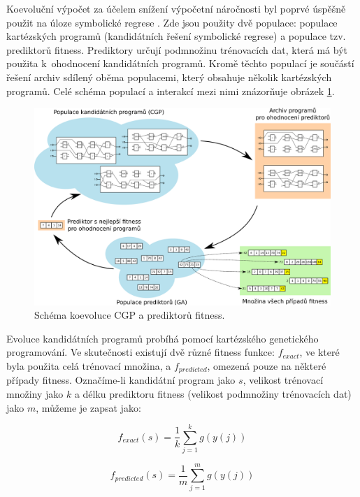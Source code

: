Koevoluční výpočet za účelem snížení výpočetní náročnosti byl poprvé úspěšně použit na úloze symbolické regrese \cite{SikuEuroGP}. Zde jsou použity dvě populace: populace kartézských programů (kandidátních řešení symbolické regrese) a populace tzv. prediktorů fitness. Prediktory určují podmnožinu trénovacích dat, která má být použita k~ohodnocení kandidátních programů. Kromě těchto populací je součástí řešení archiv sdílený oběma populacemi, který obsahuje několik kartézských programů. Celé schéma populací a interakcí mezi nimi znázorňuje obrázek \ref{obrKoevoluce}.

\begin{figure}[htb]
    \centering\includegraphics[width=\textwidth]{fig/coevolution.pdf}
    \caption{Schéma koevoluce CGP a prediktorů fitness.}
    \label{obrKoevoluce}
\end{figure}

Evoluce kandidátních programů probíhá pomocí kartézského genetického programování. Ve skutečnosti existují dvě různé fitness funkce: $f_{\mathit{exact}}$, ve které byla použita celá trénovací množina, a $f_{\mathit{predicted}}$, omezená pouze na některé případy fitness. Označíme-li kandidátní program jako $s$, velikost trénovací množiny jako $k$ a délku prediktoru fitness (velikost podmnožiny trénovacích dat) jako $m$, můžeme je zapsat jako:

\begin{equation}
    \label{eqFexact}
    f_{\mathit{exact}} \left( s \right) = \frac{1}{k} \sum\limits_{j=1}^{k} g \left( y \left( j \right) \right)
\end{equation}

\begin{equation}
    \label{eqFpredicted}
    f_{\mathit{predicted}} \left( s \right) = \frac{1}{m} \sum\limits_{j=1}^{m} g \left( y \left( j \right) \right)
\end{equation}

